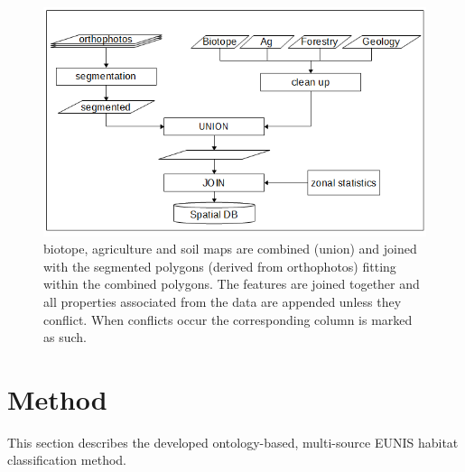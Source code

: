 \documentclass[authoryear, review,12pt,number]{elsarticle}
\begin{document}
\begin{figure} \includegraphics[width=1\textwidth]{diagrams/pre_processing.png}
    \caption{biotope, agriculture and soil maps are combined 
    (union) and joined with the segmented polygons (derived from orthophotos) 
    fitting within the combined polygons. The features are joined together 
    and all properties associated from the data are appended unless they 
    conflict. 
    When conflicts occur the corresponding column is marked as such.}
\label{fig:pre-processing}
\end{figure}
\section{Method}
This section describes the developed ontology-based, multi-source EUNIS 
habitat classification method.
\label{subsec:method_overview}
\end{document}

